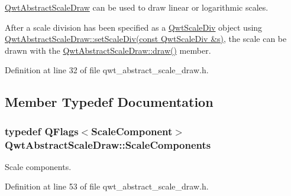 \hyperlink{class_qwt_abstract_scale_draw}{Qwt\-Abstract\-Scale\-Draw} can be used to draw linear or logarithmic scales.

After a scale division has been specified as a \hyperlink{class_qwt_scale_div}{Qwt\-Scale\-Div} object using \hyperlink{class_qwt_abstract_scale_draw_a4399aac94a294f5ed6c52114dde00d2f}{Qwt\-Abstract\-Scale\-Draw\-::set\-Scale\-Div(const Qwt\-Scale\-Div \&s)}, the scale can be drawn with the \hyperlink{class_qwt_abstract_scale_draw_aca3c3a7499112f52616d0ee8518fa5a6}{Qwt\-Abstract\-Scale\-Draw\-::draw()} member. 

Definition at line 32 of file qwt\-\_\-abstract\-\_\-scale\-\_\-draw.\-h.



\subsection{Member Typedef Documentation}
\hypertarget{class_qwt_abstract_scale_draw_a0dd3ccdfa074fb6b1781b84ed2a4729a}{
\subsubsection[{Scale\-Components}]{\setlength{\rightskip}{0pt plus 5cm}typedef Q\-Flags$<${\bf Scale\-Component}$>$ {\bf Qwt\-Abstract\-Scale\-Draw\-::\-Scale\-Components}}}\label{class_qwt_abstract_scale_draw_a0dd3ccdfa074fb6b1781b84ed2a4729a}


Scale components. 



Definition at line 53 of file qwt\-\_\-abstract\-\_\-scale\-\_\-draw.\-h.



